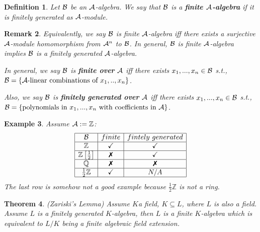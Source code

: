 \documentclass[11pt]{article}
\newtheorem{thm}{Theorem}[section]
\newtheorem{dfn}[thm]{Definition}
\newtheorem{rmk}[thm]{Remark}
\newtheorem{ex}[thm]{Example}
\newcommand{\intg}{\mathbb Z}
\newcommand{\cala}{{\cal A}}
\newcommand{\calb}{{\cal B}}
\newcommand{\xmark}{\ding{55}}%
\begin{document}
\begin{dfn} Let $\calb$ be an $\cala$-algebra.
We say that $\calb$ is a\textbf{ finite $\cala$-algebra} if it is finitely generated as $\cala$-module. 
 \end{dfn}

\begin{rmk}
Equivalently, we say $\calb$ is finite $\cala$-algebra iff there exists a surjective $\cala$-module homomorphism from $\cala^n$ to $\calb$. In general, $\calb$ is finite $\cala$-algebra implies $\calb$ is a finitely generated $\cala$-algebra.

In general, we say $\calb$ is \textbf{finite over} $\cala$ iff there exists $x_1,...,x_n\in\calb$ s.t., $\calb=\{\cala\text{-linear combinations of $x_1,..,x_n$}\}$. 

Also, we say $\calb$ is \textbf{finitely generated over} $\cala$ iff there exists $x_1,...,x_n\in\calb$ s.t., $\calb=\{\text{polynomials in $x_1,...,x_n$ with coefficients in $\cala$}\}$.
\end{rmk}

\begin{ex} Assume
$\cala:=\intg$: 
\begin{equation*}
\begin{array}{ |c |c| c| }
\hline
\mathcal{B}  & finite & fintely\ generated\\
\hline
\mathbb{Z}  & \checkmark & \checkmark    \\
\hline
\mathbb{Z}\left[\frac{1}{2}\right] & \text{\xmark} & \checkmark\\
\hline
\mathbb{Q}  & \text{\xmark} & \text{\xmark}\\
\hline
\frac{1}{2}\mathbb{Z}  & \checkmark & N/A\\
\hline
\end{array}
\end{equation*}
The last row is somehow not a good example because $\frac{1}{2}\intg$ is not a ring.
\end{ex}

\begin{thm}\label{thm:finite_field_extension}(Zariski's Lemma)
Assume $K$a field, $K\subseteq  L$, where $ L$ is also a field. Assume $ L$ is a finitely generated $K$-algebra,  then $ L$ is a finite $K$-algebra which is equivalent to $ L/K$ being a finite algebraic field extension.
\end{thm}
\end{document}
